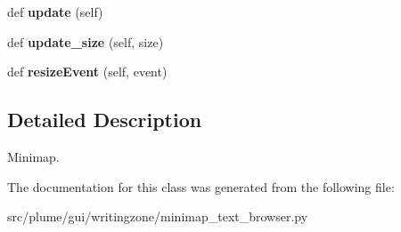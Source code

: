 \begin{DoxyCompactItemize}
\item 
def {\bfseries update} (self)\hypertarget{classplume-creator_1_1src_1_1plume_1_1gui_1_1writingzone_1_1minimap__text__browser_1_1_minimap2_a0f4ecc7daae5c4b39ded26864c36a131}{}\label{classplume-creator_1_1src_1_1plume_1_1gui_1_1writingzone_1_1minimap__text__browser_1_1_minimap2_a0f4ecc7daae5c4b39ded26864c36a131}

\item 
def {\bfseries update\+\_\+size} (self, size)\hypertarget{classplume-creator_1_1src_1_1plume_1_1gui_1_1writingzone_1_1minimap__text__browser_1_1_minimap2_a749d23cbb3d256bd30ceaa596e8d4d1a}{}\label{classplume-creator_1_1src_1_1plume_1_1gui_1_1writingzone_1_1minimap__text__browser_1_1_minimap2_a749d23cbb3d256bd30ceaa596e8d4d1a}

\item 
def {\bfseries resize\+Event} (self, event)\hypertarget{classplume-creator_1_1src_1_1plume_1_1gui_1_1writingzone_1_1minimap__text__browser_1_1_minimap2_aec12fbb091691caef66acfdc351aa0fa}{}\label{classplume-creator_1_1src_1_1plume_1_1gui_1_1writingzone_1_1minimap__text__browser_1_1_minimap2_aec12fbb091691caef66acfdc351aa0fa}

\end{DoxyCompactItemize}


\subsection{Detailed Description}
Minimap. 

The documentation for this class was generated from the following file\+:\begin{DoxyCompactItemize}
\item 
src/plume/gui/writingzone/minimap\+\_\+text\+\_\+browser.\+py\end{DoxyCompactItemize}
